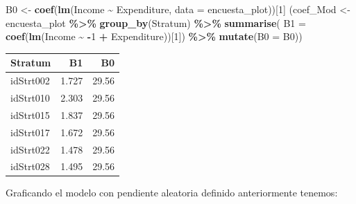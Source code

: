 \documentclass[
  12pt,
]{book}
\newenvironment{Shaded}{\begin{snugshade}}{\end{snugshade}}
\newcommand{\AttributeTok}[1]{\textcolor[rgb]{0.13,0.29,0.53}{#1}}
\newcommand{\DecValTok}[1]{\textcolor[rgb]{0.00,0.00,0.81}{#1}}
\newcommand{\FunctionTok}[1]{\textcolor[rgb]{0.13,0.29,0.53}{\textbf{#1}}}
\newcommand{\NormalTok}[1]{#1}
\newcommand{\OtherTok}[1]{\textcolor[rgb]{0.56,0.35,0.01}{#1}}
\newcommand{\SpecialCharTok}[1]{\textcolor[rgb]{0.81,0.36,0.00}{\textbf{#1}}}
\begin{document}
\begin{Shaded}
\begin{Highlighting}[]
\NormalTok{B0 }\OtherTok{\textless{}{-}} \FunctionTok{coef}\NormalTok{(}\FunctionTok{lm}\NormalTok{(Income }\SpecialCharTok{\textasciitilde{}}\NormalTok{ Expenditure,}
              \AttributeTok{data =}\NormalTok{ encuesta\_plot))[}\DecValTok{1}\NormalTok{]}
\NormalTok{(coef\_Mod }\OtherTok{\textless{}{-}}\NormalTok{ encuesta\_plot }\SpecialCharTok{\%\textgreater{}\%} \FunctionTok{group\_by}\NormalTok{(Stratum) }\SpecialCharTok{\%\textgreater{}\%} 
  \FunctionTok{summarise}\NormalTok{(}
    \AttributeTok{B1 =} \FunctionTok{coef}\NormalTok{(}\FunctionTok{lm}\NormalTok{(Income }\SpecialCharTok{\textasciitilde{}} \SpecialCharTok{{-}}\DecValTok{1} \SpecialCharTok{+}\NormalTok{ Expenditure))[}\DecValTok{1}\NormalTok{]) }\SpecialCharTok{\%\textgreater{}\%} 
  \FunctionTok{mutate}\NormalTok{(}\AttributeTok{B0 =}\NormalTok{ B0))}
\end{Highlighting}
\end{Shaded}

\begin{tabular}{l|r|r}
\hline
Stratum & B1 & B0\\
\hline
idStrt002 & 1.727 & 29.56\\
\hline
idStrt010 & 2.303 & 29.56\\
\hline
idStrt015 & 1.837 & 29.56\\
\hline
idStrt017 & 1.672 & 29.56\\
\hline
idStrt022 & 1.478 & 29.56\\
\hline
idStrt028 & 1.495 & 29.56\\
\hline
\end{tabular}

Graficando el modelo con pendiente aleatoria definido anteriormente tenemos:
\end{document}
